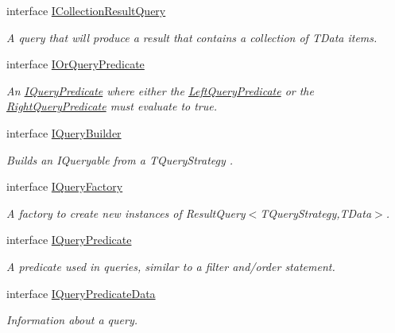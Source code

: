 \begin{DoxyCompactItemize}
interface \hyperlink{interfaceCqrs_1_1Repositories_1_1Queries_1_1ICollectionResultQuery}{I\+Collection\+Result\+Query}
\begin{DoxyCompactList}\small\item\em A query that will produce a result that contains a collection of {\itshape T\+Data}  items. \end{DoxyCompactList}\item 
interface \hyperlink{interfaceCqrs_1_1Repositories_1_1Queries_1_1IOrQueryPredicate}{I\+Or\+Query\+Predicate}
\begin{DoxyCompactList}\small\item\em An \hyperlink{interfaceCqrs_1_1Repositories_1_1Queries_1_1IQueryPredicate}{I\+Query\+Predicate} where either the \hyperlink{interfaceCqrs_1_1Repositories_1_1Queries_1_1IOrQueryPredicate_a714d125899714f5aabc2d50e4ffb9834_a714d125899714f5aabc2d50e4ffb9834}{Left\+Query\+Predicate} or the \hyperlink{interfaceCqrs_1_1Repositories_1_1Queries_1_1IOrQueryPredicate_a72ad26892989a09527ead9a2ecce5d47_a72ad26892989a09527ead9a2ecce5d47}{Right\+Query\+Predicate} must evaluate to true. \end{DoxyCompactList}\item 
interface \hyperlink{interfaceCqrs_1_1Repositories_1_1Queries_1_1IQueryBuilder}{I\+Query\+Builder}
\begin{DoxyCompactList}\small\item\em Builds an I\+Queryable from a {\itshape T\+Query\+Strategy} . \end{DoxyCompactList}\item 
interface \hyperlink{interfaceCqrs_1_1Repositories_1_1Queries_1_1IQueryFactory}{I\+Query\+Factory}
\begin{DoxyCompactList}\small\item\em A factory to create new instances of Result\+Query$<$\+T\+Query\+Strategy,\+T\+Data$>$. \end{DoxyCompactList}\item 
interface \hyperlink{interfaceCqrs_1_1Repositories_1_1Queries_1_1IQueryPredicate}{I\+Query\+Predicate}
\begin{DoxyCompactList}\small\item\em A predicate used in queries, similar to a filter and/order statement. \end{DoxyCompactList}\item 
interface \hyperlink{interfaceCqrs_1_1Repositories_1_1Queries_1_1IQueryPredicateData}{I\+Query\+Predicate\+Data}
\begin{DoxyCompactList}\small\item\em Information about a query. \end{DoxyCompactList}\item 

\end{DoxyCompactItemize}
